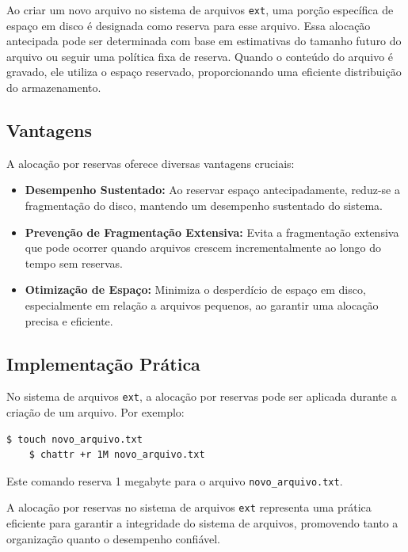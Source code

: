 \documentclass[
	12pt,				%
	openright,			%
	oneside,			%
	a4paper,			%
	chapter=TITLE,		%
	english,			%
	french,				%
	spanish,			%
	brazil				%
	]{abntex2}
\theoremstyle{definition}
\begin{document}
Ao criar um novo arquivo no sistema de arquivos \texttt{ext}, uma porção específica de espaço em disco é designada como reserva para esse arquivo. Essa alocação antecipada pode ser determinada com base em estimativas do tamanho futuro do arquivo ou seguir uma política fixa de reserva. Quando o conteúdo do arquivo é gravado, ele utiliza o espaço reservado, proporcionando uma eficiente distribuição do armazenamento.

\subsection{Vantagens}
A alocação por reservas oferece diversas vantagens cruciais:

\begin{itemize}
    \item \textbf{Desempenho Sustentado:} Ao reservar espaço antecipadamente, reduz-se a fragmentação do disco, mantendo um desempenho sustentado do sistema.
    
    \item \textbf{Prevenção de Fragmentação Extensiva:} Evita a fragmentação extensiva que pode ocorrer quando arquivos crescem incrementalmente ao longo do tempo sem reservas.
    
    \item \textbf{Otimização de Espaço:} Minimiza o desperdício de espaço em disco, especialmente em relação a arquivos pequenos, ao garantir uma alocação precisa e eficiente.
\end{itemize}

\subsection{Implementação Prática}
No sistema de arquivos \texttt{ext}, a alocação por reservas pode ser aplicada durante a criação de um arquivo. Por exemplo:


\begin{lstlisting}[caption={Exemplo de Alocação por Reservas}]
	$ touch novo_arquivo.txt   
	$ chattr +r 1M novo_arquivo.txt   
\end{lstlisting}
	
Este comando reserva 1 megabyte para o arquivo \texttt{novo\_arquivo.txt}.

A alocação por reservas no sistema de arquivos \texttt{ext} representa uma prática eficiente para garantir a integridade do sistema de arquivos, promovendo tanto a organização quanto o desempenho confiável.
\end{document}

